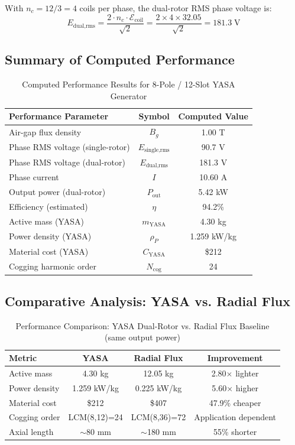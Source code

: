 \documentclass[12pt,a4paper]{article}
\begin{document}
With $n_c = 12/3 = 4$ coils per phase, the dual-rotor RMS phase voltage is:
\begin{equation}
E_{\text{dual,rms}} = \frac{2 \cdot n_c \cdot \mathcal{E}_{\text{coil}}}{\sqrt{2}} = \frac{2 \times 4 \times 32.05}{\sqrt{2}} = 181.3 \; \text{V}
\end{equation}

\subsection{Summary of Computed Performance}

\begin{table}[!htbp]
\centering
\caption{Computed Performance Results for 8-Pole / 12-Slot YASA Generator}
\label{tab:results}
\begin{tabular}{|l|c|c|}
\hline
\textbf{Performance Parameter} & \textbf{Symbol} & \textbf{Computed Value} \\
\hline
Air-gap flux density & $B_g$ & 1.00 T \\
Phase RMS voltage (single-rotor) & $E_{\text{single,rms}}$ & 90.7 V \\
Phase RMS voltage (dual-rotor) & $E_{\text{dual,rms}}$ & 181.3 V \\
Phase current & $I$ & 10.60 A \\
Output power (dual-rotor) & $P_{\text{out}}$ & 5.42 kW \\
Efficiency (estimated) & $\eta$ & 94.2\% \\
Active mass (YASA) & $m_{\text{YASA}}$ & 4.30 kg \\
Power density (YASA) & $\rho_P$ & 1.259 kW/kg \\
Material cost (YASA) & $C_{\text{YASA}}$ & \$212 \\
Cogging harmonic order & $N_{\text{cog}}$ & 24 \\
\hline
\end{tabular}
\end{table}

\subsection{Comparative Analysis: YASA vs. Radial Flux}

\begin{table}[!htbp]
\centering
\caption{Performance Comparison: YASA Dual-Rotor vs. Radial Flux Baseline (same output power)}
\label{tab:comparison}
\begin{tabular}{|l|c|c|c|}
\hline
\textbf{Metric} & \textbf{YASA} & \textbf{Radial Flux} & \textbf{Improvement} \\
\hline
Active mass & 4.30 kg & 12.05 kg & 2.80$\times$ lighter \\
Power density & 1.259 kW/kg & 0.225 kW/kg & 5.60$\times$ higher \\
Material cost & \$212 & \$407 & 47.9\% cheaper \\
Cogging order & LCM(8,12)=24 & LCM(8,36)=72 & Application dependent \\
Axial length & $\sim$80 mm & $\sim$180 mm & 55\% shorter \\
\hline
\end{tabular}
\end{table}
\end{document}
